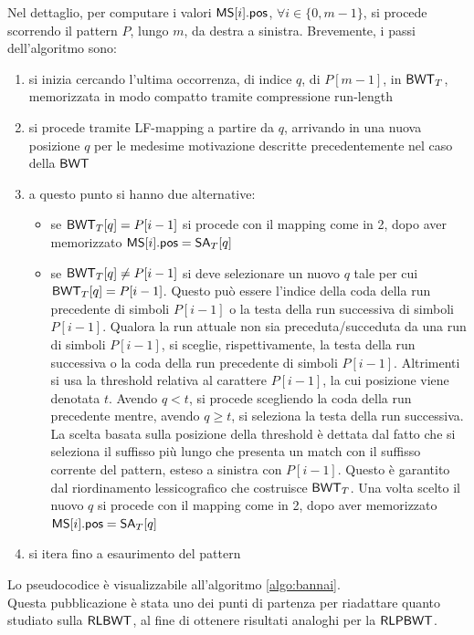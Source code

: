 Nel dettaglio, per computare i valori $\mbox{\rm {\sf MS}}[i].\mbox{\rm {\sf pos}}$, $\forall i\in\{0,m-1\}$,
 si procede scorrendo il
pattern $P$, lungo $m$, da destra a sinistra. Brevemente, i passi dell'algoritmo
sono: 
\begin{enumerate}
  \item si inizia cercando l'ultima occorrenza, di indice $q$, di $P[m-1]$,
  in $\mbox{\rm {\sf BWT}}_T$, memorizzata in modo
  compatto tramite compressione run-length
  \item si procede tramite LF-mapping a partire da $q$, arrivando in
  una nuova posizione $q$ per le medesime motivazione descritte precedentemente
  nel caso della $\mbox{\rm {\sf BWT}}$
  \item a questo punto si hanno due alternative:
  \begin{itemize}
    \item se $\mbox{\rm {\sf BWT}}_T[q]=P[i-1]$ si procede con il mapping come in 2, dopo aver
    memorizzato
    $\mbox{\rm {\sf MS}}[i].\mbox{\rm {\sf pos}} = \mbox{\rm {\sf SA}}_T[q]$
    \item se $\mbox{\rm {\sf BWT}}_T[q]\neq P[i-1]$ si deve selezionare un nuovo $q$ tale per cui
    $\mbox{\rm {\sf BWT}}_T[q]=P[i-1]$. Questo può essere l'indice della coda della run
    precedente di simboli $P[i-1]$ o la testa della run successiva di simboli
    $P[i-1]$. Qualora la run attuale non sia
    preceduta/succeduta da una run di simboli $P[i-1]$, si sceglie,
    rispettivamente, la testa della run successiva o la coda della run
    precedente di simboli $P[i-1]$. Altrimenti si usa la threshold relativa al
    carattere $P[i-1]$, la cui posizione viene denotata $t$. Avendo
    $q<t$, si procede scegliendo la coda della run precedente mentre, avendo
    $q\geq t$, si seleziona la testa della run successiva. La scelta basata
    sulla posizione della threshold è dettata dal fatto che si
    seleziona il suffisso più lungo che presenta un match
    con il suffisso corrente del pattern, esteso a sinistra con $P[i-1]$.
    Questo è
    garantito dal riordinamento lessicografico che costruisce $\mbox{\rm {\sf BWT}}_T$. 
    Una volta
    scelto il nuovo $q$ si procede con il mapping come in 2, dopo aver 
    memorizzato $\mbox{\rm {\sf MS}}[i].\mbox{\rm {\sf pos}} = \mbox{\rm {\sf SA}}_T[q]$
  \end{itemize}
  \item si itera fino a esaurimento del pattern
\end{enumerate}
Lo pseudocodice è visualizzabile all'algoritmo \ref{algo:bannai}.\\
Questa pubblicazione è stata uno dei punti di partenza per
riadattare quanto studiato sulla $\mbox{\rm {\sf RLBWT}}$, al fine di ottenere
risultati analoghi per la $\mbox{\rm {\sf RLPBWT}}$.\\
